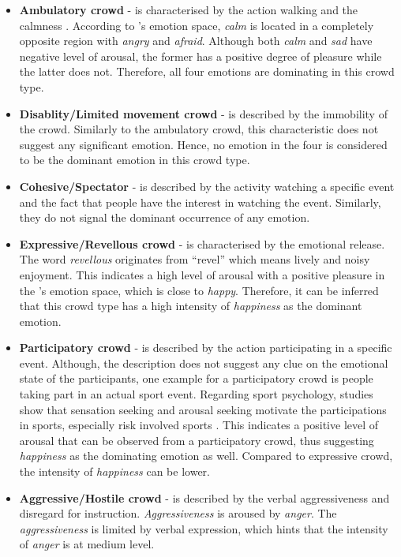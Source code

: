 \begin{itemize}
\item \textbf{Ambulatory crowd} - is characterised by the action walking and the calmness \citep{Zeitz2009}. According to \citet{russell1980circumplex}'s emotion space, \textit{calm} is located in a completely opposite region with \textit{angry} and \textit{afraid}. Although both \textit{calm} and \textit{sad} have negative level of arousal, the former has a positive degree of pleasure while the latter does not. Therefore, all four emotions are dominating in this crowd type.
\item \textbf{Disablity/Limited movement crowd} - is described by the immobility of the crowd. Similarly to the ambulatory crowd, this characteristic does not suggest any significant emotion. Hence, no emotion in the four is considered to be the dominant emotion in this crowd type.
\item \textbf{Cohesive/Spectator} - is described by the activity watching a specific event and the fact that people have the interest in watching the event. Similarly, they do not signal the dominant occurrence of any emotion.
\item \textbf{Expressive/Revellous crowd} - is characterised by the emotional release. The word \textit{revellous} originates from ``revel'' which means lively and noisy enjoyment. This indicates a high level of arousal with a positive pleasure in the \citet{russell1980circumplex}'s emotion space, which is close to \textit{happy}. Therefore, it can be inferred that this crowd type has a high intensity of \textit{happiness} as the dominant emotion.
\item \textbf{Participatory crowd} - is described by the action participating in a specific event. Although, the description does not suggest any clue on the emotional state of the participants, one example for a participatory crowd is people taking part in an actual sport event. Regarding sport psychology, studies show that sensation seeking and arousal seeking motivate the participations in sports, especially risk involved sports \citep{rowland1986sensation}. This indicates a positive level of arousal that can be observed from a participatory crowd, thus suggesting \textit{happiness} as the dominating emotion as well. Compared to expressive crowd, the intensity of \textit{happiness} can be lower.
\item \textbf{Aggressive/Hostile crowd} - is described by the verbal aggressiveness and disregard for instruction. \textit{Aggressiveness} is aroused by \textit{anger}. The \textit{aggressiveness} is limited by verbal expression, which hints that the intensity of \textit{anger} is at medium level.

\end{itemize}
